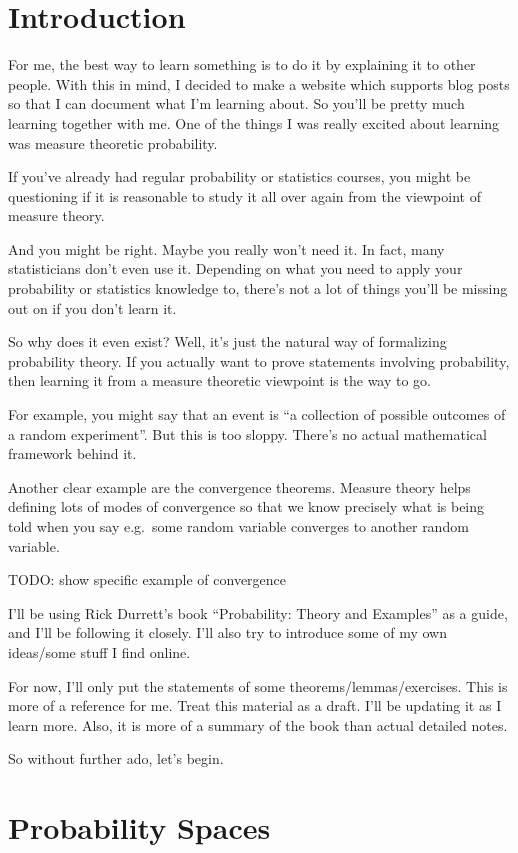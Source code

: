 \documentclass{article}
\theoremstyle{definition}
\begin{document}
\section{Introduction}

For me, the best way to learn something is to do it by explaining it to other people. With this in mind,
I decided to make a website which supports blog posts so that I can document what I'm learning about.
So you'll be pretty much learning together with me. One of the things I was really excited about learning was
measure theoretic probability.

If you've already had regular probability or statistics courses, you might be questioning if it is
reasonable to study it all over again from the viewpoint of measure theory.

And you might be right. Maybe you really won't need it. In fact, many statisticians don't even use it.
Depending on what you need to apply your probability or statistics knowledge to, there's not a lot of
things you'll be missing out on if you don't learn it.

So why does it even exist? Well, it's just the natural way of formalizing probability theory. If you
actually want to prove statements involving probability, then learning it from a measure theoretic
viewpoint is the way to go.

For example, you might say that an event is ``a collection of possible outcomes of a random experiment''.
But this is too sloppy. There's no actual mathematical framework behind it.

Another clear example are the convergence theorems. Measure theory helps defining lots of modes of
convergence so that we know precisely what is being told when you say e.g.\ some random variable
converges to another random variable.

TODO: show specific example of convergence

I'll be using Rick Durrett's book ``Probability: Theory and Examples'' as a guide, and I'll be following it closely.
I'll also try to introduce some of my own ideas/some stuff I find online.

For now, I'll only put the statements of some theorems/lemmas/exercises. This is more of a reference for me. Treat
this material as a draft. I'll be updating it as I learn more. Also, it is more of a summary of the book than actual
detailed notes.

So without further ado, let's begin.

\section{Probability Spaces}
\end{document}
